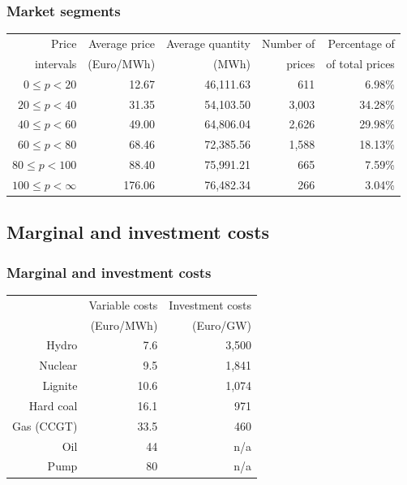 \begin{frame}
  \frametitle{Market segments}

\begin{center}
\small
\begin{tabular}{rrrrr}
  \hline
Price & Average price  & Average quantity & Number of & Percentage of \\
intervals& (Euro/MWh) &  (MWh) &  prices & of total prices\\
  \hline\hline
$0\leq p<20$ & 12.67 & 46,111.63 & 611 & 6.98\% \\
$20\leq p<40$ & 31.35 & 54,103.50 & 3,003 & 34.28\% \\
$40\leq p<60$ & 49.00 & 64,806.04 & 2,626 & 29.98\% \\
$60\leq p<80$ & 68.46 & 72,385.56 & 1,588 & 18.13\% \\
$80\leq p<100$ & 88.40 & 75,991.21 & 665 & 7.59\% \\
$100\leq p<\infty$& 176.06 & 76,482.34 & 266 & 3.04\% \\
   \hline
\end{tabular}  
\normalsize
\end{center}

\end{frame}

\subsection{Marginal and investment costs}

\begin{frame}
  \frametitle{Marginal and investment costs}
\begin{center}
  \begin{tabular}{rrr}
\hline
           & Variable costs & Investment costs\\
           &  (Euro/MWh)    &  (Euro/GW) \\
\hline\hline
     Hydro &        7.6 &    3,500\\

   Nuclear &        9.5 &    1,841 \\

   Lignite &       10.6 &    1,074 \\

 Hard coal &       16.1 &     971 \\

 Gas (CCGT) &       33.5 &     460 \\

Oil & 44            &   n/a\\

Pump &         80 &       n/a\\
\hline
\end{tabular}
\end{center}
\end{frame}

